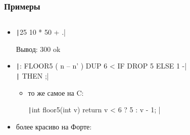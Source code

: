 \documentclass[xetex,mathserif,serif]{beamer}
\begin{document}
	\begin{frame}
		\frametitle{Примеры}
		\begin{columns}
			\begin{column}{0.82\textwidth}
				\begin{itemize}
					\item \texttt|25 10 * 50 + .|

						Вывод: 300 ok
					\item \texttt|: FLOOR5 ( n -- n' )   DUP 6 < IF DROP 5 ELSE 1 -| \\
						\texttt|  THEN ;|
					\begin{itemize}
						\item то же самое на C:

						\texttt|int floor5(int v) { return v < 6 ? 5 : v - 1; }|
					\end{itemize}
					\item более красиво на Форте:


\end{itemize}
\end{column}
\end{columns}
\end{frame}
\end{document}
